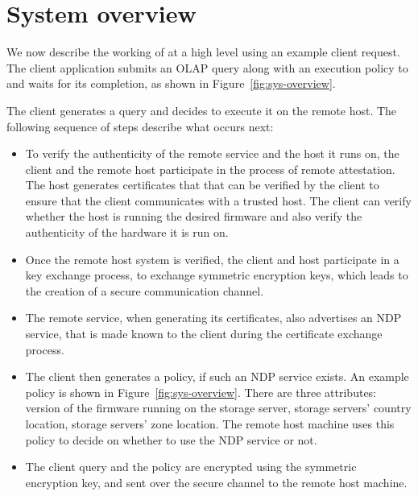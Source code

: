 \section{System overview}

\label{sec:overview}

We now describe the working of \project{} at a high level using an example client request. The client application submits an OLAP query along with an execution policy to \project{} and waits for its completion, as shown in Figure~\ref{fig:sys-overview}.

The client generates a query and decides to execute it on the remote host. The following sequence of steps describe what occurs next:
\begin{itemize}
    \item To verify the authenticity of the remote service and the host it runs on, the client and the remote host participate in the process of remote attestation. The host generates certificates that that can be verified by the client to ensure that the client communicates with a trusted host. The client can verify whether the host is running the desired firmware and also verify the authenticity of the hardware it is run on.
    \item Once the remote host system is verified, the client and host participate in a key exchange process, to exchange symmetric encryption keys, which leads to the creation of a secure communication channel.
    \item The remote service, when generating its certificates, also advertises an NDP service, that is made known to the client during the certificate exchange process.
    \item The client then generates a policy, if such an NDP service exists. An example policy is shown in Figure~\ref{fig:sys-overview}. There are three attributes: version of the firmware running on the storage server, storage servers' country location, storage servers' zone location. The remote host machine uses this policy to decide on whether to use the NDP service or not.
    \item The client query and the policy are encrypted using the symmetric encryption key, and sent over the secure channel to the remote host machine.
\end{itemize}

